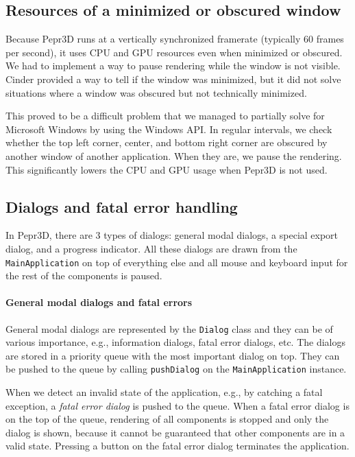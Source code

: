 \subsection{Resources of a minimized or obscured window}

Because Pepr3D runs at a vertically synchronized framerate (typically 60 frames per second), it uses CPU and GPU resources even when minimized or obscured.
We had to implement a way to pause rendering while the window is not visible.
Cinder provided a way to tell if the window was minimized, but it did not solve situations where a window was obscured but not technically minimized.

This proved to be a difficult problem that we managed to partially solve for Microsoft Windows by using the Windows API.
In regular intervals, we check whether the top left corner, center, and bottom right corner are obscured by another window of another application.
When they are, we pause the rendering.
This significantly lowers the CPU and GPU usage when Pepr3D is not used.

\subsection{Dialogs and fatal error handling}

In Pepr3D, there are 3 types of dialogs: general modal dialogs, a special export dialog, and a progress indicator.
All these dialogs are drawn from the \texttt{MainApplication} on top of everything else and all mouse and keyboard input for the rest of the components is paused.

\paragraph{General modal dialogs and fatal errors}
General modal dialogs are represented by the \texttt{Dialog} class and they can be of various importance, e.g., information dialogs, fatal error dialogs, etc.
The dialogs are stored in a priority queue with the most important dialog on top.
They can be pushed to the queue by calling \texttt{pushDialog} on the \texttt{MainApplication} instance.

When we detect an invalid state of the application, e.g., by catching a fatal exception, a \emph{fatal error dialog} is pushed to the queue.
When a fatal error dialog is on the top of the queue, rendering of all components is stopped and only the dialog is shown, because it cannot be guaranteed that other components are in a valid state.
Pressing a button on the fatal error dialog terminates the application.

